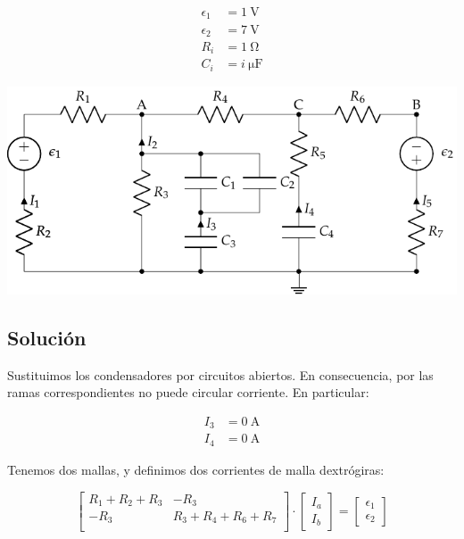 \documentclass[10pt]{article}
\begin{document}
\begin{minipage}[c]{0.3\linewidth}
  \begin{align*}
    \epsilon_1&=\SI{1}{\volt}\\
    \epsilon_2&=\SI{7}{\volt}\\
    R_i &= \SI{1}{\ohm}\\
    C_i &= \SI{i}{\micro\farad}
  \end{align*}
\end{minipage}
\begin{minipage}[c]{0.7\linewidth}
  \includegraphics{figs/mallas_agrupacion_condensadores.pdf}
\end{minipage}

\subsection*{Solución}

Sustituimos los condensadores por circuitos abiertos. En consecuencia, por las ramas correspondientes no puede circular corriente. En particular:

\begin{align*}
  I_3 &= \SI{0}{\ampere}\\
  I_4 &= \SI{0}{\ampere}
\end{align*}

Tenemos dos mallas, y definimos dos corrientes de malla dextrógiras:

\begin{equation*}
  \begin{bmatrix}
    R_1 + R_2 + R_3 & -R_3\\
    -R_3 & R_3 + R_4 + R_6 + R_7\\
  \end{bmatrix} \cdot %
  \begin{bmatrix}
    I_a\\
    I_b
  \end{bmatrix} = %
  \begin{bmatrix}
    \epsilon_1\\
    \epsilon_2
  \end{bmatrix}
\end{equation*}
\end{document}
